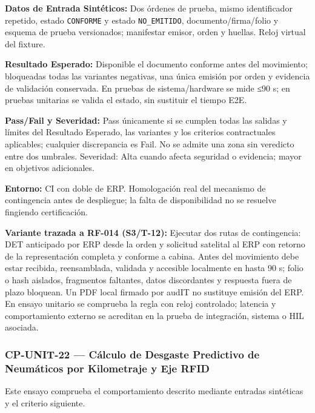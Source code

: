 \par\noindent\textbf{Datos de Entrada Sintéticos:} Dos órdenes de prueba, mismo identificador repetido, estado \texttt{C\allowbreak{}O\allowbreak{}N\allowbreak{}F\allowbreak{}O\allowbreak{}R\allowbreak{}M\allowbreak{}E\allowbreak{}} y estado \texttt{N\allowbreak{}O\allowbreak{}\_\allowbreak{}E\allowbreak{}M\allowbreak{}I\allowbreak{}T\allowbreak{}I\allowbreak{}D\allowbreak{}O\allowbreak{}}, documento/firma/folio y esquema de prueba versionados; manifestar emisor, orden y huellas. Reloj virtual del fixture.\par
\par\noindent\textbf{Resultado Esperado:} Disponible el documento conforme antes del movimiento; bloqueadas todas las variantes negativas, una única emisión por orden y evidencia de validación conservada. En pruebas de sistema/hardware se mide ≤90 s; en pruebas unitarias se valida el estado, sin sustituir el tiempo E2E.\par
\par\noindent\textbf{Pass/Fail y Severidad:} Pass únicamente si se cumplen todas las salidas y límites del Resultado Esperado, las variantes y los criterios contractuales aplicables; cualquier discrepancia es Fail. No se admite una zona sin veredicto entre dos umbrales. Severidad: Alta cuando afecta seguridad o evidencia; mayor en objetivos adicionales.\par
\par\noindent\textbf{Entorno:} CI con doble de ERP. Homologación real del mecanismo de contingencia antes de despliegue; la falta de disponibilidad no se resuelve fingiendo certificación.\par


\par\noindent\textbf{Variante trazada a RF-014 (S3/T-12):} Ejecutar dos rutas de contingencia: DET anticipado por ERP desde la orden y solicitud satelital al ERP con retorno de la representación completa y conforme a cabina. Antes del movimiento debe estar recibida, reensamblada, validada y accesible localmente en hasta 90 s; folio o hash aislados, fragmentos faltantes, datos discordantes y respuesta fuera de plazo bloquean. Un PDF local firmado por audIT no sustituye emisión del ERP. En ensayo unitario se comprueba la regla con reloj controlado; latencia y comportamiento externo se acreditan en la prueba de integración, sistema o HIL asociada.\par
\subsubsection*{CP-UNIT-22 — Cálculo de Desgaste Predictivo de Neumáticos por Kilometraje y Eje RFID}\label{sec:9-cp-unit-22}
Este ensayo comprueba el comportamiento descrito mediante entradas sintéticas y el criterio siguiente.


